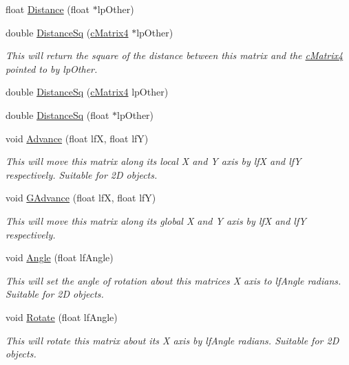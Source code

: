 \begin{DoxyCompactItemize}
float \hyperlink{classc_matrix4_a83fd4655f67a81cb42f3c50262ec593e}{Distance} (float $\ast$lpOther)
\item 
double \hyperlink{classc_matrix4_afb4a1edc36d2de9330e48bd182fe2a9b}{DistanceSq} (\hyperlink{classc_matrix4}{cMatrix4} $\ast$lpOther)
\begin{DoxyCompactList}\small\item\em This will return the square of the distance between this matrix and the \hyperlink{classc_matrix4}{cMatrix4} pointed to by lpOther. \item\end{DoxyCompactList}\item 
double \hyperlink{classc_matrix4_ad225d8db157a99b593f774e08c266722}{DistanceSq} (\hyperlink{classc_matrix4}{cMatrix4} lpOther)
\item 
double \hyperlink{classc_matrix4_ac524fac9525c6ff780e95c648b229e41}{DistanceSq} (float $\ast$lpOther)
\item 
void \hyperlink{classc_matrix4_ab956ec27a465b889126632475fd7d703}{Advance} (float lfX, float lfY)
\begin{DoxyCompactList}\small\item\em This will move this matrix along its local X and Y axis by lfX and lfY respectively. Suitable for 2D objects. \item\end{DoxyCompactList}\item 
void \hyperlink{classc_matrix4_a2dc12cbe708c7bc63ca2beff47c0c835}{GAdvance} (float lfX, float lfY)
\begin{DoxyCompactList}\small\item\em This will move this matrix along its global X and Y axis by lfX and lfY respectively. \item\end{DoxyCompactList}\item 
void \hyperlink{classc_matrix4_ac86eb165802e359a11ace5db20b73c72}{Angle} (float lfAngle)
\begin{DoxyCompactList}\small\item\em This will set the angle of rotation about this matrices X axis to lfAngle radians. Suitable for 2D objects. \item\end{DoxyCompactList}\item 
void \hyperlink{classc_matrix4_ab21d0553250b8ca4b0388105afc79478}{Rotate} (float lfAngle)
\begin{DoxyCompactList}\small\item\em This will rotate this matrix about its X axis by lfAngle radians. Suitable for 2D objects. \item\end{DoxyCompactList}\item 

\end{DoxyCompactItemize}
